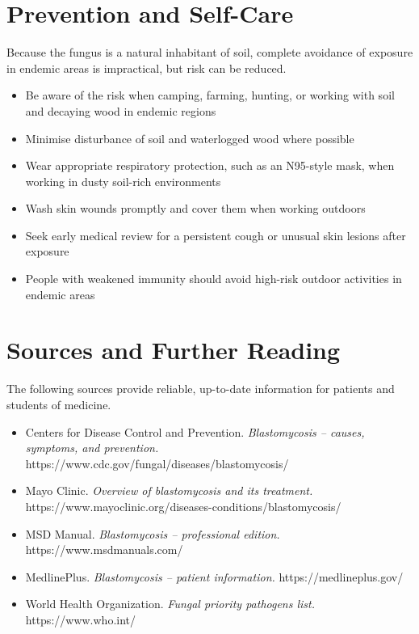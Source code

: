 \section*{Prevention and Self-Care}
Because the fungus is a natural inhabitant of soil, complete avoidance of exposure in endemic areas is impractical, but risk can be reduced.

\begin{itemize}
    \item Be aware of the risk when camping, farming, hunting, or working with soil and decaying wood in endemic regions
    \item Minimise disturbance of soil and waterlogged wood where possible
    \item Wear appropriate respiratory protection, such as an N95-style mask, when working in dusty soil-rich environments
    \item Wash skin wounds promptly and cover them when working outdoors
    \item Seek early medical review for a persistent cough or unusual skin lesions after exposure
    \item People with weakened immunity should avoid high-risk outdoor activities in endemic areas
\end{itemize}

\section*{Sources and Further Reading}
The following sources provide reliable, up-to-date information for patients and students of medicine.

\begin{itemize}
    \item Centers for Disease Control and Prevention. \textit{Blastomycosis -- causes, symptoms, and prevention.} https://www.cdc.gov/fungal/diseases/blastomycosis/
    \item Mayo Clinic. \textit{Overview of blastomycosis and its treatment.} https://www.mayoclinic.org/diseases-conditions/blastomycosis/
    \item MSD Manual. \textit{Blastomycosis -- professional edition.} https://www.msdmanuals.com/
    \item MedlinePlus. \textit{Blastomycosis -- patient information.} https://medlineplus.gov/
    \item World Health Organization. \textit{Fungal priority pathogens list.} https://www.who.int/
\end{itemize}
